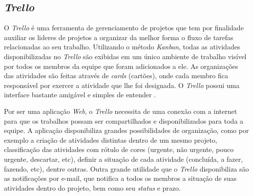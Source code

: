 \subsection{\textbf{\textit{Trello}}}

O \textit{Trello} é uma ferramenta de gerenciamento de projetos que tem por finalidade auxiliar os lideres de projetos a organizar da melhor forma o fluxo de tarefas relacionadas ao seu trabalho. Utilizando o método \textit{Kanban}, todas as atividades disponibilizadas no \textit{Trello} são exibidas em um único ambiente de trabalho visível por todos os membros da equipe que foram adicionados a ele. As organizações das atividades são feitas através de \textit{cards} (cartões), onde cada membro fica responsável por exercer a atividade que lhe foi designada. O \textit{Trello } possui uma interface bastante amigável e simples de entender \cite{TRELLO2017}. 

Por ser uma aplicação \textit{Web}, o \textit{Trello} necessita de uma conexão com a internet para que os trabalhos possam ser compartilhados e disponibilizados para toda a equipe. A aplicação disponibiliza grandes possibilidades de organização, como por exemplo a criação de atividades distintas dentro de um mesmo projeto, classificação das atividades com rótulo de cores (urgente, não urgente, pouco urgente, descartar, etc), definir a situação de cada atividade (concluída, a fazer, fazendo, etc), dentre outras. Outra grande utilidade que o \textit{Trello} disponibiliza são as notificações por e-mail, que notifica a todos os membros a situação de suas atividades dentro do projeto, bem como seu \textit{status} e prazo.